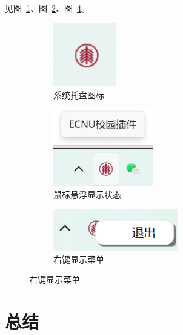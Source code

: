 \documentclass[14pt,a4paper,UTF8,twoside]{article}
\begin{document}
见图\ \ref{fig:tray-icon}、图\ \ref{fig:tray-icon-hover}、图\ \ref{fig:tray-icon-menu}。

\begin{figure}[H]
    \centering
    \begin{subfigure}[H]{0.3\textwidth}
        \centering
        \includegraphics[width=0.3\textwidth]{img/tray_icon}
        \caption{系统托盘图标}
        \label{fig:tray-icon}
    \end{subfigure}
    \begin{subfigure}[H]{0.3\textwidth}
        \centering
        \includegraphics[width=0.48\textwidth]{img/tray_icon_hover}
        \caption{鼠标悬浮显示状态}
        \label{fig:tray-icon-hover}
    \end{subfigure}
    \begin{subfigure}[H]{0.3\textwidth}
        \centering
        \includegraphics[width=0.6\textwidth]{img/tray_icon_menu}
        \caption{右键显示菜单}
        \label{fig:tray-icon-menu}
    \end{subfigure}
\end{figure}

\section{总结}
\end{document}
